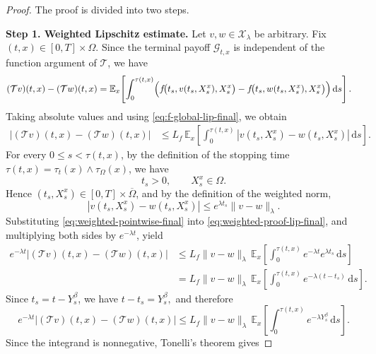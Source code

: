\documentclass[a4paper,fleqn]{cas-sc}
\begin{document}
\begin{proof}
The proof is divided into two steps.

\medskip
\noindent
\textbf{Step 1. Weighted Lipschitz estimate.}
Let $v,w\in\mathcal{X}_\lambda$ be arbitrary. Fix $(t,x)\in[0,T]\times\Omega$. Since the terminal payoff $\mathcal{G}_{t,x}$ is independent of the function argument of $\mathcal{T}$, we have
\begin{align}
(\mathcal{T}v)(t,x)-(\mathcal{T}w)(t,x)
&=
\mathbb{E}_x\!\left[
\int_0^{\tau(t,x)}
\Bigl(
f\!\bigl(t_s,v(t_s,X_s^x),X_s^x\bigr)
-
f\!\bigl(t_s,w(t_s,X_s^x),X_s^x\bigr)
\Bigr)\,\mathrm{d}s
\right].
\label{eq:weighted-proof-diff-final}
\end{align}
Taking absolute values and using \eqref{eq:f-global-lip-final}, we obtain
\begin{align}
|(\mathcal{T}v)(t,x)-(\mathcal{T}w)(t,x)|
&\le
L_f\,
\mathbb{E}_x\!\left[
\int_0^{\tau(t,x)}
|v(t_s,X_s^x)-w(t_s,X_s^x)|
\,\mathrm{d}s
\right].
\label{eq:weighted-proof-lip-final}
\end{align}
For every $0\le s<\tau(t,x)$, by the definition of the stopping time $\tau(t,x)=\tau_t(x)\wedge \tau_\Omega(x)$, we have
\[
t_s>0,
\qquad
X_s^x\in\Omega.
\]
Hence $(t_s,X_s^x)\in[0,T]\times\overline{\Omega}$, and by the definition of the weighted norm,
\begin{equation}\label{eq:weighted-pointwise-final}
|v(t_s,X_s^x)-w(t_s,X_s^x)|
\le
e^{\lambda t_s}\|v-w\|_\lambda .
\end{equation}
Substituting \eqref{eq:weighted-pointwise-final} into \eqref{eq:weighted-proof-lip-final}, and multiplying both sides by $e^{-\lambda t}$, yield
\begin{align}
e^{-\lambda t}|(\mathcal{T}v)(t,x)-(\mathcal{T}w)(t,x)|
&\le
L_f\|v-w\|_\lambda\,
\mathbb{E}_x\!\left[
\int_0^{\tau(t,x)}
e^{-\lambda t}e^{\lambda t_s}\,\mathrm{d}s
\right]
\nonumber\\
&=
L_f\|v-w\|_\lambda\,
\mathbb{E}_x\!\left[
\int_0^{\tau(t,x)}
e^{-\lambda(t-t_s)}\,\mathrm{d}s
\right].
\label{eq:weighted-proof-after-weight-final}
\end{align}
Since $t_s=t-Y_s^\beta$, we have
\(
t-t_s=Y_s^\beta,
\)
and therefore
\begin{equation}\label{eq:weighted-proof-before-tonelli-final}
e^{-\lambda t}|(\mathcal{T}v)(t,x)-(\mathcal{T}w)(t,x)|
\le
L_f\|v-w\|_\lambda\,
\mathbb{E}_x\!\left[
\int_0^{\tau(t,x)}
e^{-\lambda Y_s^\beta}\,\mathrm{d}s
\right].
\end{equation}
Since the integrand is nonnegative, Tonelli's theorem gives

\end{proof}
\end{document}

